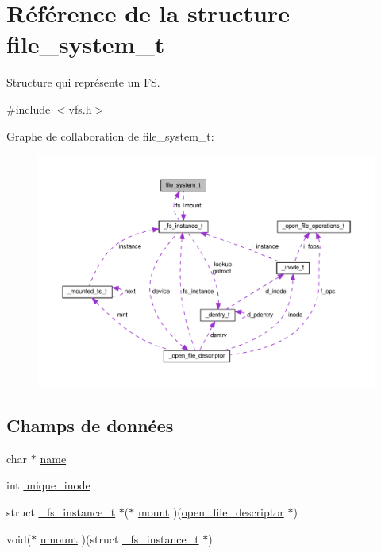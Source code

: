 \hypertarget{structfile__system__t}{\section{Référence de la structure file\+\_\+system\+\_\+t}
\label{structfile__system__t}
}


Structure qui représente un F\+S.  




{\ttfamily \#include $<$vfs.\+h$>$}



Graphe de collaboration de file\+\_\+system\+\_\+t\+:
\nopagebreak
\begin{figure}[H]
\begin{center}
\leavevmode
\includegraphics[width=350pt]{structfile__system__t__coll__graph}
\end{center}
\end{figure}
\subsection*{Champs de données}
\begin{DoxyCompactItemize}
\item 
char $\ast$ \hyperlink{structfile__system__t_a2b7d7c0f769113d1164052beeeca777d}{name}
\item 
int \hyperlink{structfile__system__t_a3cf80f0c2c2b7a9c202d5006e4095eaf}{unique\+\_\+inode}
\item 
struct \hyperlink{struct__fs__instance__t}{\+\_\+fs\+\_\+instance\+\_\+t} $\ast$($\ast$ \hyperlink{structfile__system__t_a7edaed95e6ac68991bbaac6cd07b458b}{mount} )(\hyperlink{fd__types_8h_a42bccb9b6a816213613cefffced245f0}{open\+\_\+file\+\_\+descriptor} $\ast$)
\item 
void($\ast$ \hyperlink{structfile__system__t_a899f34d838d88470373b60f7c5f0edd9}{umount} )(struct \hyperlink{struct__fs__instance__t}{\+\_\+fs\+\_\+instance\+\_\+t} $\ast$)
\end{DoxyCompactItemize}


